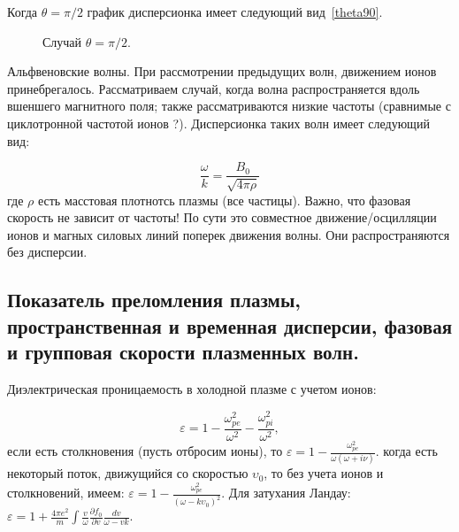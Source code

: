 \documentclass[10pt, a4paper]{article}
\numberwithin{equation}{section}
\begin{document}
Когда $\theta=\pi/2$ график дисперсионка имеет следующий вид~\ref{theta90}.
\begin{figure}[h!]
    \caption{\label{theta-90} Случай $\theta=\pi/2$.}
\end{figure}

Альфвеновские волны. При рассмотрении предыдущих волн, движением ионов принебрегалось. Рассматриваем случай, когда волна распространяется вдоль вшеншего магнитного поля; также рассматриваются низкие частоты (сравнимые с циклотронной частотой ионов ?). Дисперсионка таких волн имеет следующий вид:

\begin{equation}
    \label{alfven}
    \frac{\omega}{k}=\frac{B_0}{\sqrt{4\pi \rho}}
\end{equation}
где $\rho$ есть масстовая плотнотсь плазмы (все частицы). Важно, что фазовая скорость не зависит от частоты! По сути это совместное движение/осцилляции ионов и магных силовых линий поперек движения волны. Они распространяются без дисперсии.

\subsection{Показатель преломления плазмы, пространственная и временная дисперсии, фазовая и групповая скорости плазменных волн.}
\label{sec.7.2}


Диэлектрическая проницаемость в холодной плазме с учетом ионов:

\begin{equation}
    \label{eq.7.7}
    \varepsilon=1 - \frac{\omega_{pe}^2}{\omega^2} - \frac{\omega_{pi}^2}{\omega^2},
\end{equation}
если есть столкновения (пусть отбросим ионы), то $\varepsilon=1-\frac{\omega_{pe}^2}{\omega (\omega+i \nu)}$. когда есть некоторый поток, движущийся со скоростью $\upsilon_0$, то без учета ионов и столкновений, имеем: $\varepsilon=1-\frac{\omega_{pe}^2}{(\omega - k \upsilon_0)^2}$.
Для затухания Ландау: $\varepsilon=1+\frac{4\pi e^2}{m} \int \frac{v}{\omega} \frac{\partial f_0}{\partial v} \frac{dv}{\omega-vk}$.
\end{document}
